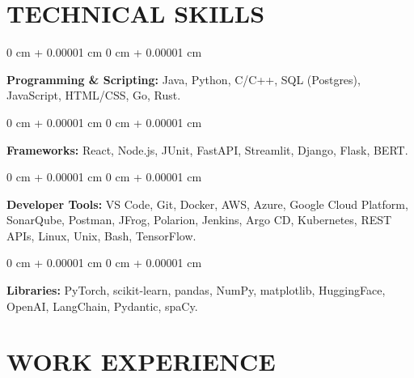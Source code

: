 \documentclass[9pt, letterpaper]{article}
\newenvironment{onecolentry}{
    \begin{adjustwidth}{
        0 cm + 0.00001 cm}{
        0 cm + 0.00001 cm}
}{
    \end{adjustwidth}
} %
\begin{document}
\section{TECHNICAL SKILLS}
        
    \begin{onecolentry}
    \textbf{Programming \& Scripting:} Java, Python, C/C++, SQL (Postgres), JavaScript, HTML/CSS, Go, Rust.
    \end{onecolentry}

    \begin{onecolentry}
    \textbf{Frameworks:} React, Node.js, JUnit, FastAPI, Streamlit, Django, Flask, BERT.
    \end{onecolentry}
    
    \begin{onecolentry}
    \textbf{Developer Tools:} VS Code, Git, Docker, AWS, Azure, Google Cloud Platform, SonarQube, Postman, JFrog, Polarion, Jenkins, Argo CD, Kubernetes, REST APIs, Linux, Unix, Bash, TensorFlow.
    \end{onecolentry}
    
    \begin{onecolentry}
    \textbf{Libraries:} PyTorch, scikit-learn, pandas, NumPy, matplotlib, HuggingFace, OpenAI, LangChain, Pydantic, spaCy.
    \end{onecolentry}

% 


% 

\section{WORK EXPERIENCE}
\end{document}
